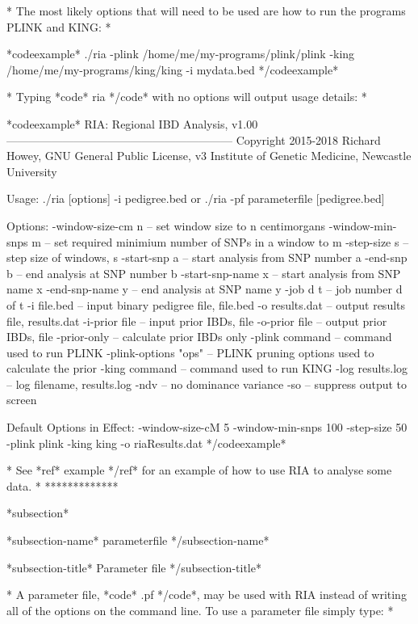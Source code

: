 *
The most likely options that will need to be used are how to run the programs PLINK and KING:
*

*codeexample*
./ria -plink /home/me/my-programs/plink/plink -king /home/me/my-programs/king/king -i mydata.bed
*/codeexample*

*
Typing *code* ria */code* with no options will output usage details:
*

*codeexample*
RIA: Regional IBD Analysis, v1.00
------------------------------------------------------------
Copyright 2015-2018 Richard Howey, GNU General Public License, v3
Institute of Genetic Medicine, Newcastle University

Usage:
  ./ria [options] -i pedigree.bed
 or ./ria -pf parameterfile [pedigree.bed]

Options:
  -window-size-cm n     -- set window size to n centimorgans
  -window-min-snps m    -- set required minimium number of SNPs in a window to m
  -step-size s          -- step size of windows, s
  -start-snp a          -- start analysis from SNP number a
  -end-snp b            -- end analysis at SNP number b
  -start-snp-name x     -- start analysis from SNP name x
  -end-snp-name y       -- end analysis at SNP name y
  -job d t              -- job number d of t
  -i file.bed           -- input binary pedigree file, file.bed
  -o results.dat        -- output results file, results.dat
  -i-prior file         -- input prior IBDs, file
  -o-prior file         -- output prior IBDs, file
  -prior-only           -- calculate prior IBDs only
  -plink command        -- command used to run PLINK
  -plink-options "ops"  -- PLINK pruning options used to calculate the prior
  -king command         -- command used to run KING
  -log results.log      -- log filename, results.log
  -ndv                  -- no dominance variance
  -so                   -- suppress output to screen

Default Options in Effect:
  -window-size-cM 5
  -window-min-snps 100
  -step-size 50
  -plink plink
  -king king
  -o riaResults.dat
*/codeexample*

*
See *ref* example */ref* for an example of how to use RIA to analyse some data.
*
*************

*subsection*

*subsection-name* parameterfile */subsection-name*

*subsection-title* Parameter file */subsection-title*

* A parameter file, *code* .pf */code*, may be used with RIA instead of writing all of the options on the command line. To use a parameter file simply type: *

